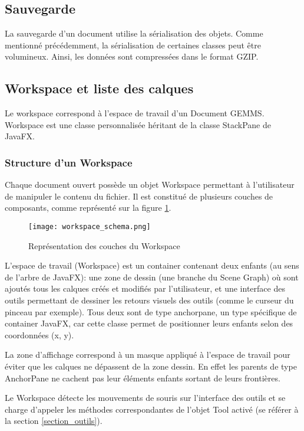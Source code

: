 \subsection{Sauvegarde}
La sauvegarde d'un document utilise la sérialisation des objets. Comme mentionné précédemment, la sérialisation de certaines classes peut être volumineux. Ainsi, les données sont compressées dans le format GZIP.

\subsection{Workspace et liste des calques}
Le \gls{workspace} correspond à l'espace de travail d'un Document GEMMS. Workspace est une classe personnalisée héritant de la classe StackPane de JavaFX. 

\subsubsection{Structure d'un Workspace}
Chaque document ouvert possède un objet Workspace permettant à l'utilisateur de manipuler le contenu du fichier. Il est constitué de plusieurs couches de composants, comme représenté sur la figure \ref{fig:workspace_representation}.


\begin{figure}[H]
	\caption{Représentation des couches du Workspace}
	\centering
	\texttt{[image: workspace\_schema.png]}
	\label{fig:workspace_representation}
\end{figure}

L'espace de travail (Workspace) est un container contenant deux enfants (au sens de l'arbre de JavaFX): une zone de dessin (une branche du Scene Graph) où sont ajoutés tous les calques créés et modifiés par l'utilisateur, et une interface des outils permettant de dessiner les retours visuels des outils (comme le curseur du pinceau par exemple). Tous deux sont de type \gls{anchorpane}, un type spécifique de container JavaFX, car cette classe permet de positionner leurs enfants selon des coordonnées (x, y).

La zone d'affichage correspond à un masque appliqué à l'espace de travail pour éviter que les calques ne dépassent de la zone dessin. En effet les parents de type AnchorPane ne cachent pas leur éléments enfants sortant de leurs frontières.

Le Workspace détecte les mouvements de souris sur l'interface des outils et se charge d'appeler les méthodes correspondantes de l'objet Tool activé (se référer à la section \ref{section_outils}).

